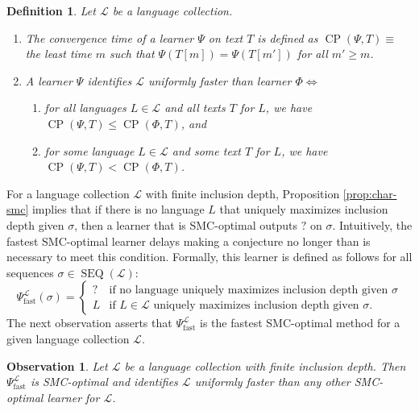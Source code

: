 \documentclass{elsarticle}%
\newtheorem{definition}[theorem]{Definition}
\newtheorem{observation}[theorem]{Observation}
\DeclareMathOperator{\SEQ}{SEQ}
\DeclareMathOperator{\CONV}{CP}
\renewcommand{\L}{\mathcal{L}}
\newcommand{\fast}{\mathrm{fast}}
\begin{document}
\begin{definition} \label{def:speed} Let $\L$ be a language collection.
\begin{enumerate}
\item The convergence time of a learner $\Psi$ on text $T$ is defined as
$\CONV(\Psi,T)\equiv$ the least time $m$ such that 
$\Psi(T[m])=\Psi(T[m'])$ for all $m'\geq m$.

\item A learner $\Psi$ identifies $\L$ uniformly
faster than learner $\Phi\iff$
\begin{enumerate}
\item for all languages $L\in\L$ and all texts $T$ for $L$, we have
$\CONV(\Psi,T)\leq \CONV(\Phi,T)$, and

\item for some language $L\in\L$ and some text $T$ for $L$, we have
$\CONV(\Psi,T)<\CONV(\Phi,T)$.
\end{enumerate}
\end{enumerate}
\end{definition}
%
For a language collection $\L$ with finite inclusion depth,
Proposition \ref{prop:char-smc} implies that if there is no language $L$ that
uniquely maximizes inclusion depth given $\sigma$, then a learner that is
SMC-optimal outputs $?$ on $\sigma$. Intuitively, the fastest SMC-optimal learner delays %
making a conjecture no longer than is necessary to meet this condition. 
Formally, this learner is defined as follows for
all sequences $\sigma\in \SEQ(\L)$:%
$$
\Psi_\fast^{\L}(\sigma)=
\begin{cases}
? & \text{if no language uniquely maximizes inclusion depth
given }\sigma\\
L & \text{if $L \in \L$ uniquely maximizes inclusion depth given $\sigma$.} 
\end{cases}
$$
The next observation asserts that $\Psi_\fast^{\L}$ is the fastest SMC-optimal method for a given language collection $\L$.

\begin{observation}
\label{obs:fastest}Let $\L$ be a language collection with finite
inclusion depth. Then $\Psi_\fast^{\L}$ is SMC-optimal and
identifies $\L$ uniformly faster than any other SMC-optimal learner
for $\L$.
\end{observation}
\end{document}
